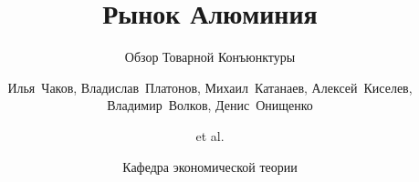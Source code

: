 \title[Макроэкономическое планирование] %
{Рынок Алюминия}

\subtitle{Обзор Товарной Конъюнктуры}

\author[4-МЭО-ЭАКГС] %
    {Илья~Чаков, 
    Владислав~Платонов,
    Михаил~Катанаев,
    Алексей~Киселев,
    Владимир~Волков,
    Денис~Онищенко \and et al.
    }


\date[Апрель 2025] %
{Кафедра экономической теории}